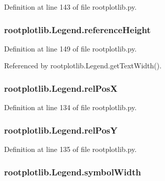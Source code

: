 Definition at line 143 of file rootplotlib.\-py.

\subsubsection[{reference\-Height}]{\setlength{\rightskip}{0pt plus 5cm}rootplotlib.\-Legend.\-reference\-Height}\label{classrootplotlib_1_1Legend_ab00f75a59879455ad8e9b7cfbcf378ae}


Definition at line 149 of file rootplotlib.\-py.



Referenced by rootplotlib.\-Legend.\-get\-Text\-Width().

\subsubsection[{rel\-Pos\-X}]{\setlength{\rightskip}{0pt plus 5cm}rootplotlib.\-Legend.\-rel\-Pos\-X}\label{classrootplotlib_1_1Legend_ad3731c796ced73daa958bcb2595186b8}


Definition at line 134 of file rootplotlib.\-py.

\subsubsection[{rel\-Pos\-Y}]{\setlength{\rightskip}{0pt plus 5cm}rootplotlib.\-Legend.\-rel\-Pos\-Y}\label{classrootplotlib_1_1Legend_ae90fe42494d84fdcd176d41724491f2b}


Definition at line 135 of file rootplotlib.\-py.

\subsubsection[{symbol\-Width}]{\setlength{\rightskip}{0pt plus 5cm}rootplotlib.\-Legend.\-symbol\-Width}\label{classrootplotlib_1_1Legend_a5cd5502de2a4bce2f1bf1d479e51a194}


